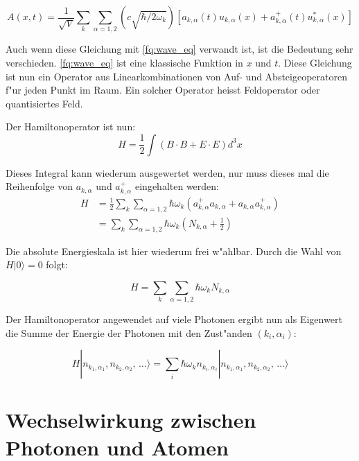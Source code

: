 \begin{equation}
A(x,t) = \frac{1}{\sqrt{V}} \sum_k \sum_{\alpha=1,2} \left(c \sqrt{\hbar/2 \omega_k}\right)\left[a_{k,\alpha}(t) u_{k,\alpha}(x) + a^+_{k,\alpha}(t) u^*_{k,\alpha}(x) \right]
\end{equation}

Auch wenn diese Gleichung mit \ref{fq:wave_eq} verwandt ist, ist die Bedeutung sehr verschieden. \ref{fq:wave_eq} ist eine klassische Funktion in $x$ und $t$. Diese Gleichung ist nun ein Operator aus Linearkombinationen von Auf- und Absteigeoperatoren f"ur jeden Punkt im Raum. Ein solcher Operator heisst Feldoperator oder quantisiertes Feld.

Der Hamiltonoperator ist nun:
\begin{equation}
H = \frac{1}{2} \int (B \cdot B + E \cdot E) d^3 x
\end{equation}

Dieses Integral kann wiederum ausgewertet werden, nur muss dieses mal die Reihenfolge von $a_{k,\alpha}$ und $a^+_{k,\alpha}$ eingehalten werden:
\begin{equation}
\begin{split}
H &= \frac{1}{2} \sum_k \sum_{\alpha=1,2} \hbar \omega_k (a^+_{k,\alpha} a_{k,\alpha} + a_{k,\alpha} a^+_{k,\alpha}) \\
&= \sum_k \sum_{\alpha=1,2} \hbar \omega_k (N_{k,\alpha} + \frac{1}{2} )
\end{split}
\end{equation}

Die absolute Energieskala ist hier wiederum frei w"ahlbar. Durch die Wahl von $H|0\rangle = 0$ folgt:

\begin{equation}
H = \sum_k \sum_{\alpha=1,2} \hbar \omega_k N_{k,\alpha}
\end{equation}

Der Hamiltonoperator angewendet auf viele Photonen ergibt nun als Eigenwert die Summe der Energie der Photonen mit den Zust"anden $(k_i,\alpha_i)$:

\begin{equation}
H |n_{k_1,\alpha_1}, n_{k_2,\alpha_2}, \, \hdots\rangle = \sum_i \hbar \omega_k n_{k_i,\alpha_i} |n_{k_1,\alpha_1}, n_{k_2,\alpha_2}, \, \hdots\rangle
\end{equation}

\section{Wechselwirkung zwischen Photonen und Atomen}


